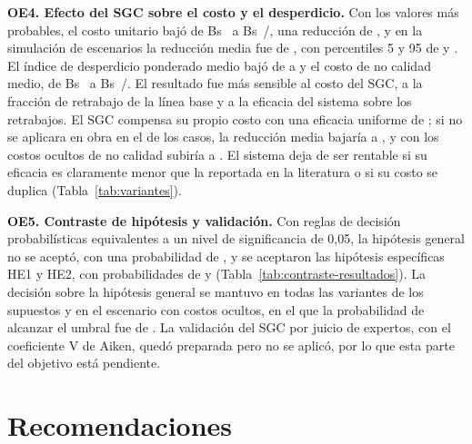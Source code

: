 \textbf{OE4. Efecto del SGC sobre el costo y el desperdicio.} Con los valores más probables, el costo unitario bajó de Bs~\CUsinDet{} a Bs~\CUconDet/\mdos{}, una reducción de \rDet{}, y en la simulación de \MCiter{} escenarios la reducción media fue de \rMedia{}, con percentiles 5 y 95 de \rPcinco{} y \rPnoventaycinco{}. El índice de desperdicio ponderado medio bajó de \IDMsinMedia{} a \IDMconMedia{} y el costo de no calidad medio, de Bs~\CNCsinMedia{} a Bs~\CNCconMedia/\mdos{}. El resultado fue más sensible al costo del SGC, a la fracción de retrabajo de la línea base y a la eficacia del sistema sobre los retrabajos. El SGC compensa su propio costo con una eficacia uniforme de \KequilibrioCero{}; si no se aplicara en obra en el \PiFalla{} de los casos, la reducción media bajaría a \rMediaFalla{}, y con los costos ocultos de no calidad subiría a \rMediaOcultos{}. El sistema deja de ser rentable si su eficacia es claramente menor que la reportada en la literatura o si su costo se duplica (Tabla~\ref{tab:variantes}).

\textbf{OE5. Contraste de hipótesis y validación.} Con reglas de decisión probabilísticas equivalentes a un nivel de significancia de 0,05, la hipótesis general no se aceptó, con una probabilidad de \PHG{}, y se aceptaron las hipótesis específicas HE1 y HE2, con probabilidades de \PHEuno{} y \PHEdos{} (Tabla~\ref{tab:contraste-resultados}). La decisión sobre la hipótesis general se mantuvo en todas las variantes de los supuestos y en el escenario con costos ocultos, en el que la probabilidad de alcanzar el umbral fue de \PHGocultos{}. La validación del SGC por juicio de expertos, con el coeficiente V de Aiken, quedó preparada pero no se aplicó, por lo que esta parte del objetivo está pendiente. 

\section{Recomendaciones}


